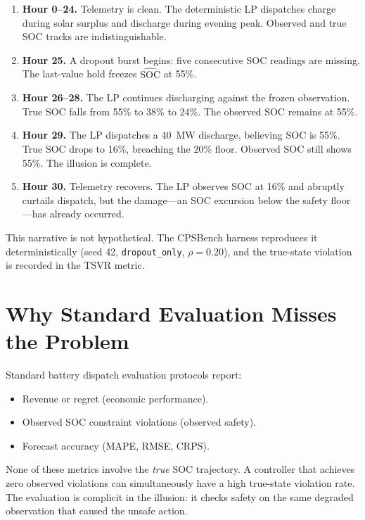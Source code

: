 \begin{enumerate}
  \item \textbf{Hour 0--24.}  Telemetry is clean.  The deterministic LP
    dispatches charge during solar surplus and discharge during evening
    peak.  Observed and true SOC tracks are indistinguishable.
  \item \textbf{Hour 25.}  A dropout burst begins: five consecutive SOC
    readings are missing.  The last-value hold freezes
    $\widehat{\mathrm{SOC}}$ at 55\%.
  \item \textbf{Hour 26--28.}  The LP continues discharging against the
    frozen observation.  True SOC falls from 55\% to 38\% to 24\%.  The
    observed SOC remains at 55\%.
  \item \textbf{Hour 29.}  The LP dispatches a 40~MW discharge, believing
    SOC is 55\%.  True SOC drops to 16\%, breaching the 20\% floor.
    Observed SOC still shows 55\%.  The illusion is complete.
  \item \textbf{Hour 30.}  Telemetry recovers.  The LP observes SOC at
    16\% and abruptly curtails dispatch, but the damage---an SOC
    excursion below the safety floor---has already occurred.
\end{enumerate}

This narrative is not hypothetical.  The CPSBench harness reproduces it
deterministically (seed 42, \texttt{dropout\_only}, $\rho = 0.20$), and
the true-state violation is recorded in the TSVR metric.

\section{Why Standard Evaluation Misses the Problem}
\label{sec:standard-eval-fails}

Standard battery dispatch evaluation protocols report:

\begin{itemize}
  \item Revenue or regret (economic performance).
  \item Observed SOC constraint violations (observed safety).
  \item Forecast accuracy (MAPE, RMSE, CRPS).
\end{itemize}

None of these metrics involve the \emph{true} SOC trajectory.  A
controller that achieves zero observed violations can simultaneously have
a high true-state violation rate.  The evaluation is complicit in the
illusion: it checks safety on the same degraded observation that caused
the unsafe action.

